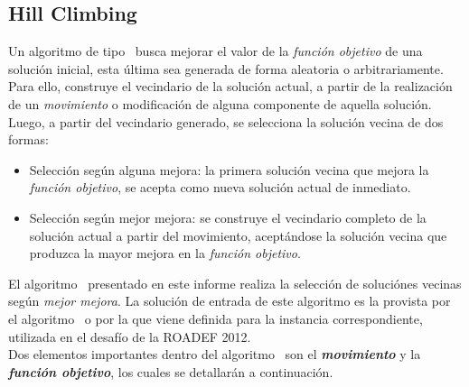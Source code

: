 \documentclass[../informe2.tex]{subfiles}
\begin{document}
\subsection{Hill Climbing}
Un algoritmo de tipo \hillc\ busca mejorar el valor de la \textit{función objetivo} de una solución inicial, esta última sea generada de forma aleatoria o arbitrariamente. Para ello, construye el vecindario de la solución actual, a partir de la realización de un \textit{movimiento} o modificación de alguna componente de aquella solución. Luego, a partir del vecindario generado, se selecciona la solución vecina de dos formas:
\begin{itemize}
	\item Selección según alguna mejora: la primera solución vecina que mejora la \textit{función objetivo}, se acepta como nueva solución actual de inmediato.
	\item Selección según mejor mejora: se construye el vecindario completo de la solución actual a partir del movimiento,  aceptándose la solución vecina que produzca la mayor mejora en la \textit{función objetivo}.
\end{itemize}

El algoritmo \hillc\ presentado en este informe realiza la selección de soluciónes vecinas según \textit{mejor mejora}. La solución de entrada de este algoritmo es la provista por el algoritmo \greedy\ o por la que viene definida para la instancia correspondiente, utilizada en el desafío de la ROADEF 2012.\\

Dos elementos importantes dentro del algoritmo \hillc\ son el \textbf{\textit{movimiento}} y la \textbf{\textit{función objetivo}}, los cuales se detallarán a continuación.
\end{document}
